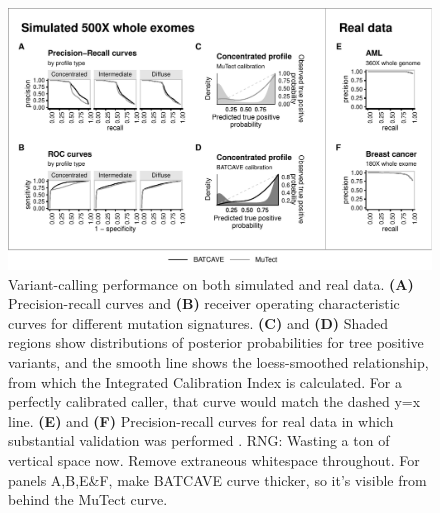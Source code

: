 \documentclass[a4,center,fleqn]{NAR}
\newcommand{\rngcomment}[1]{{\color{red}RNG: #1}}
\newcommand{\batcave}{BATCAVE\xspace}
\begin{document}

  \begin{figure}
    \begin{center}
    \includegraphics[width=\textwidth]{figures/fig_wes.pdf}
    \end{center}
    \caption{Variant-calling performance on both simulated and real data.
    \textbf{(A)} Precision-recall curves and \textbf{(B)} receiver operating characteristic curves for different mutation signatures.
    \textbf{(C)} and \textbf{(D)} Shaded regions show distributions of posterior probabilities for tree positive variants, and the smooth line shows the loess-smoothed relationship, from which the Integrated Calibration Index is calculated. For a perfectly calibrated caller, that curve would match the dashed y=x line. 
    \textbf{(E)} and \textbf{(F)} Precision-recall curves for real data in which substantial validation was performed \cite{Griffith2015,Shi2018}.
    \rngcomment{Wasting a ton of vertical space now. Remove extraneous whitespace throughout. For panels A,B,E\&F, make \batcave curve thicker, so it's visible from behind the MuTect curve.}
}
  \label{NAR-wes_fig}
  \end{figure}
  
\end{document}
